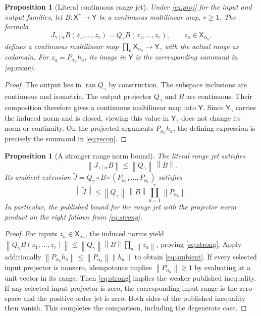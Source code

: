 \documentclass[11pt]{article}
\newtheorem{proposition}[theorem]{Proposition}
\theoremstyle{remark}\newtheorem{remark}[theorem]{Remark}
\newcommand{\X}{\mathsf X}\newcommand{\Y}{\mathsf Y}\newcommand{\Z}{\mathsf Z}
\newcommand{\norm}[1]{\left\lVert#1\right\rVert}
\newcommand{\op}{\operatorname}
\begin{document}
\begin{proposition}[Literal continuous range jet]\label{prop:rangejet}
Under \eqref{eq:proj} for the input and output families, let $B:\X^r\to\Y$ be a continuous multilinear map, $r\ge1$. The formula
\[
J_{\gamma\mid\alpha}B(z_1,\ldots,z_r)
=Q_\gamma B(z_1,\ldots,z_r),\qquad z_a\in\X_{\alpha_a},
\]
defines a continuous multilinear map $\prod_a\X_{\alpha_a}\to\Y_\gamma$ with the actual range as codomain. For $z_a=P_{\alpha_a}h_a$, its image in $\Y$ is the corresponding summand in \eqref{eq:recon}.
\end{proposition}
\begin{proof}
The output lies in $\op{ran}Q_\gamma$ by construction. The subspace inclusions are continuous and isometric. The output projector $Q_\gamma$ and $B$ are continuous. Their composition therefore gives a continuous multilinear map into $\Y$. Since $\Y_\gamma$ carries the induced norm and is closed, viewing this value in $\Y_\gamma$ does not change its norm or continuity. On the projected arguments $P_{\alpha_a}h_a$, the defining expression is precisely the summand in \eqref{eq:recon}.
\end{proof}

\begin{proposition}[A stronger range norm bound]\label{prop:norm}
The literal range jet satisfies
\begin{equation}\label{eq:strong}
\norm{J_{\gamma\mid\alpha}B}\le \norm{Q_\gamma}\,\norm{B}.
\end{equation}
Its ambient extension $\widetilde J=Q_\gamma\circ B\circ(P_{\alpha_1},\ldots,P_{\alpha_r})$ satisfies
\begin{equation}\label{eq:ambient}
\norm{\widetilde J}\le\norm{Q_\gamma}\,\norm{B}\prod_{a=1}^r\norm{P_{\alpha_a}}.
\end{equation}
In particular, the published bound for the range jet with the projector norm product on the right follows from \eqref{eq:strong}.
\end{proposition}
\begin{proof}
For inputs $z_a\in\X_{\alpha_a}$, the induced norms yield
$\norm{Q_\gamma B(z_1,\ldots,z_r)}\le\norm{Q_\gamma}\norm{B}\prod_a\norm{z_a}$, proving \eqref{eq:strong}. Apply additionally $\norm{P_{\alpha_a}h_a}\le\norm{P_{\alpha_a}}\norm{h_a}$ to obtain \eqref{eq:ambient}. If every selected input projector is nonzero, idempotence implies $\norm{P_{\alpha_a}}\ge1$ by evaluating at a unit vector in its range. Then \eqref{eq:strong} implies the weaker published inequality. If any selected input projector is zero, the corresponding input range is the zero space and the positive-order jet is zero. Both sides of the published inequality then vanish. This completes the comparison, including the degenerate case.
\end{proof}
\end{document}
